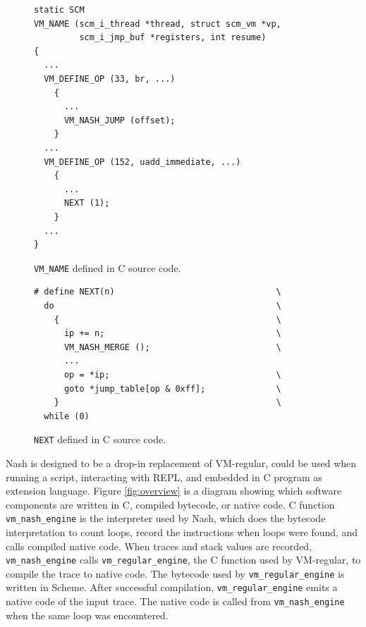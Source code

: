 \documentclass[preprint, numbers]{sigplanconf}
\begin{document}
\begin{figure}
  \centering
\begin{verbatim}
static SCM
VM_NAME (scm_i_thread *thread, struct scm_vm *vp,
         scm_i_jmp_buf *registers, int resume)
{
  ...
  VM_DEFINE_OP (33, br, ...)
    {
      ...
      VM_NASH_JUMP (offset);
    }
  ...
  VM_DEFINE_OP (152, uadd_immediate, ...)
    {
      ...
      NEXT (1);
    }
  ...
}
\end{verbatim}
\caption{\texttt{VM\_NAME} defined in C source code.}
\label{fig:vmname}
\end{figure}

\begin{figure}
\begin{verbatim}
# define NEXT(n)                                \
  do                                            \
    {                                           \
      ip += n;                                  \
      VM_NASH_MERGE ();                         \
      ...
      op = *ip;                                 \
      goto *jump_table[op & 0xff];              \
    }                                           \
  while (0)
\end{verbatim}
\caption{\texttt{NEXT} defined in C source code.}
\label{fig:cnext}
\end{figure}

Nash is designed to be a drop-in replacement of VM-regular, could be used when
running a script, interacting with REPL, and embedded in C program as
extension language. Figure \hyperref[fig:overview]{\ref{fig:overview}} is a
diagram showing which software components are written in C, compiled bytecode,
or native code. C function \texttt{vm\_nash\_engine} is the interpreter used
by Nash, which does the bytecode interpretation to count loops, record the
instructions when loops were found, and calls compiled native code. When
traces and stack values are recorded, \texttt{vm\_nash\_engine} calls
\texttt{vm\_regular\_engine}, the C function used by VM-regular, to compile
the trace to native code. The bytecode used by \texttt{vm\_regular\_engine} is
written in Scheme. After successful compilation, \texttt{vm\_regular\_engine}
emits a native code of the input trace. The native code is called from
\texttt{vm\_nash\_engine} when the same loop was encountered.
\end{document}

